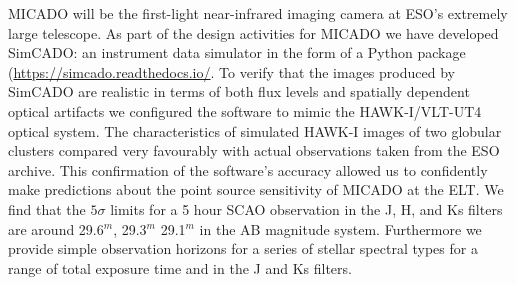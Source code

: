 \abstract
{}
{MICADO will be the first-light near-infrared imaging camera at ESO's extremely large telescope. As part of the design activities for MICADO we have developed SimCADO: an instrument data simulator in the form of a Python package (\url{https://simcado.readthedocs.io/}.}
{To verify that the images produced by SimCADO are realistic in terms of both flux levels and spatially dependent optical artifacts we configured the software to mimic the HAWK-I/VLT-UT4 optical system. The characteristics of simulated HAWK-I images of two globular clusters compared very favourably with actual observations taken from the ESO archive. This confirmation of the software's accuracy allowed us to confidently make predictions about the point source sensitivity of MICADO at the ELT.}
{We find that the $5\sigma$ limits for a 5 hour SCAO observation in the J, H, and Ks filters are around 29.6$^m$, 29.3$^m$ 29.1$^m$ in the AB magnitude system. Furthermore we provide simple observation horizons for a series of stellar spectral types for a range of total exposure time and in the J and Ks filters.}
{}
